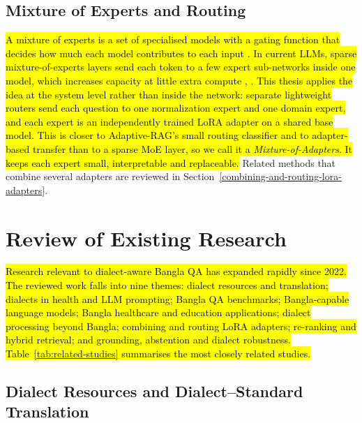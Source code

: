 \subsection{Mixture of Experts and Routing}\label{mixture-of-experts-and-routing}

\hl{A mixture of experts is a set of specialised models with a gating
function that decides how much each model contributes to each input
\cite{jacobs1991adaptive}. In current LLMs, sparse mixture-of-experts layers send each
token to a few expert sub-networks inside one model, which increases
capacity at little extra compute \cite{shazeer2017moe}, \cite{fedus2022switch}. This thesis applies
the idea at the system level rather than inside the network: separate
lightweight routers send each question to one normalization expert and
one domain expert, and each expert is an independently trained LoRA
adapter on a shared base model. This is closer to Adaptive-RAG's small
routing classifier \cite{jeong2024adaptiverag} and to adapter-based transfer \cite{houlsby2019adapters} than
to a sparse MoE layer, so we call it a \emph{Mixture-of-Adapters}. It
keeps each expert small, interpretable and replaceable.} Related methods
that combine several adapters are reviewed in
Section~\ref{combining-and-routing-lora-adapters}.

\section{Review of Existing Research}\label{review-of-existing-research}

\hl{Research relevant to dialect-aware Bangla QA has expanded rapidly
since 2022. The reviewed work falls into nine themes: dialect resources
and translation; dialects in health and LLM prompting; Bangla QA
benchmarks; Bangla-capable language models; Bangla healthcare and
education applications; dialect processing beyond Bangla; combining and
routing LoRA adapters; re-ranking and hybrid retrieval; and grounding,
abstention and dialect robustness. Table~\ref{tab:related-studies} summarises the most closely related studies.}

\subsection{Dialect Resources and Dialect--Standard Translation}\label{dialect-resources-and-dialectstandard-translation}

